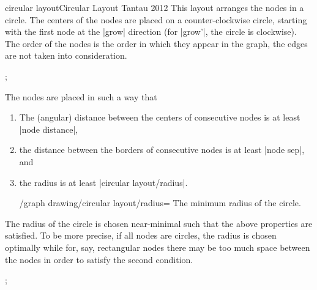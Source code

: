 \begin{gdalgorithm}{circular layout}{Circular Layout Tantau 2012}
  This layout arranges the nodes in a circle. The centers of the nodes
  are placed on a counter-clockwise circle, starting with the first
  node at the |grow| direction (for |grow'|, the circle is
  clockwise). The order of the nodes is the order in which they appear
  in the graph, the edges are not taken into consideration.

\begin{codeexample}[]
\tikz[>=spaced stealth']
  ;    
\end{codeexample}

  The nodes are placed in such a way that
  \begin{enumerate}
  \item The (angular) distance between the centers of consecutive
    nodes is at least  |node distance|,
  \item the distance between the borders of consecutive nodes is at
    least |node sep|, and
  \item the radius is at least |circular layout/radius|.
    \begin{key}{/graph drawing/circular layout/radius=}
      The minimum radius of the circle.
    \end{key}
  \end{enumerate}
  The radius of the circle is chosen near-minimal such that the above
  properties are satisfied. To be more precise, if all nodes are
  circles, the radius is chosen optimally while for, say, rectangular
  nodes there may be too much space between the nodes in order to
  satisfy the second condition.

\begin{codeexample}[]
\tikz {}; 
\end{codeexample}

\begin{codeexample}[]
\end{codeexample}
\end{gdalgorithm}
